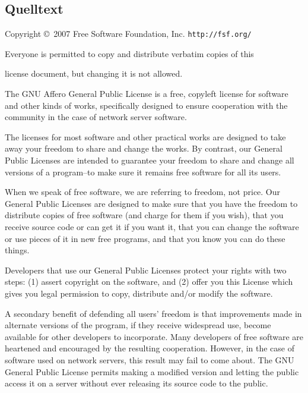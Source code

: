 \documentclass[10pt,a4paper,ngerman,titlepage,tocindentauto]{article}
\begin{document}
		\subsection{Quelltext}
		\begin{multicols}{3}
			{\tiny
				\begin{center}
					{\parindent 0in

					Copyright \copyright\  2007 Free Software Foundation, Inc. \texttt{http://fsf.org/}

					\bigskip
					Everyone is permitted to copy and distribute verbatim copies of this

					license document, but changing it is not allowed.}

					\end{center}

					\renewcommand{\abstractname}{Preamble}
					The GNU Affero General Public License is a free, copyleft license
					for software and other kinds of works, specifically designed to ensure
					cooperation with the community in the case of network server software.

					The licenses for most software and other practical works are
					designed to take away your freedom to share and change the works.  By
					contrast, our General Public Licenses are intended to guarantee your
					freedom to share and change all versions of a program--to make sure it
					remains free software for all its users.

					When we speak of free software, we are referring to freedom, not
					price.  Our General Public Licenses are designed to make sure that you
					have the freedom to distribute copies of free software (and charge for
					them if you wish), that you receive source code or can get it if you
					want it, that you can change the software or use pieces of it in new
					free programs, and that you know you can do these things.

					Developers that use our General Public Licenses protect your rights
					with two steps: (1) assert copyright on the software, and (2) offer
					you this License which gives you legal permission to copy, distribute
					and/or modify the software.

					A secondary benefit of defending all users' freedom is that
					improvements made in alternate versions of the program, if they
					receive widespread use, become available for other developers to
					incorporate.  Many developers of free software are heartened and
					encouraged by the resulting cooperation.  However, in the case of
					software used on network servers, this result may fail to come about.
					The GNU General Public License permits making a modified version and
					letting the public access it on a server without ever releasing its
					source code to the public.

}
\end{multicols}
\end{document}
